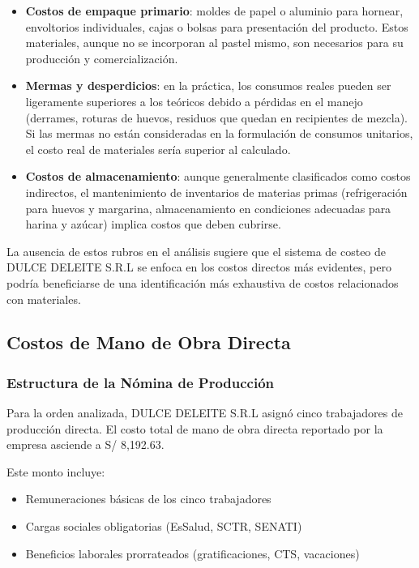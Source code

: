\documentclass[
  stu,
  floatsintext,
  longtable,
  a4paper,
  nolmodern,
  notxfonts,
  notimes,
  12pt,
  colorlinks=true,linkcolor=blue,citecolor=blue,urlcolor=blue]{apa7}
\providecommand{\tightlist}{%
  \setlength{\itemsep}{0pt}\setlength{\parskip}{0pt}}
\begin{document}
\begin{itemize}
\item
  \textbf{Costos de empaque primario}: moldes de papel o aluminio para
  hornear, envoltorios individuales, cajas o bolsas para presentación
  del producto. Estos materiales, aunque no se incorporan al pastel
  mismo, son necesarios para su producción y comercialización.
\item
  \textbf{Mermas y desperdicios}: en la práctica, los consumos reales
  pueden ser ligeramente superiores a los teóricos debido a pérdidas en
  el manejo (derrames, roturas de huevos, residuos que quedan en
  recipientes de mezcla). Si las mermas no están consideradas en la
  formulación de consumos unitarios, el costo real de materiales sería
  superior al calculado.
\item
  \textbf{Costos de almacenamiento}: aunque generalmente clasificados
  como costos indirectos, el mantenimiento de inventarios de materias
  primas (refrigeración para huevos y margarina, almacenamiento en
  condiciones adecuadas para harina y azúcar) implica costos que deben
  cubrirse.
\end{itemize}

La ausencia de estos rubros en el análisis sugiere que el sistema de
costeo de DULCE DELEITE S.R.L se enfoca en los costos directos más
evidentes, pero podría beneficiarse de una identificación más exhaustiva
de costos relacionados con materiales.

\subsection{Costos de Mano de Obra
Directa}\label{costos-de-mano-de-obra-directa}

\subsubsection{Estructura de la Nómina de
Producción}\label{estructura-de-la-nuxf3mina-de-producciuxf3n}

Para la orden analizada, DULCE DELEITE S.R.L asignó cinco trabajadores
de producción directa. El costo total de mano de obra directa reportado
por la empresa asciende a S/ 8,192.63.

Este monto incluye:

\begin{itemize}
\tightlist
\item
  Remuneraciones básicas de los cinco trabajadores
\item
  Cargas sociales obligatorias (EsSalud, SCTR, SENATI)
\item
  Beneficios laborales prorrateados (gratificaciones, CTS, vacaciones)
\end{itemize}
\end{document}
